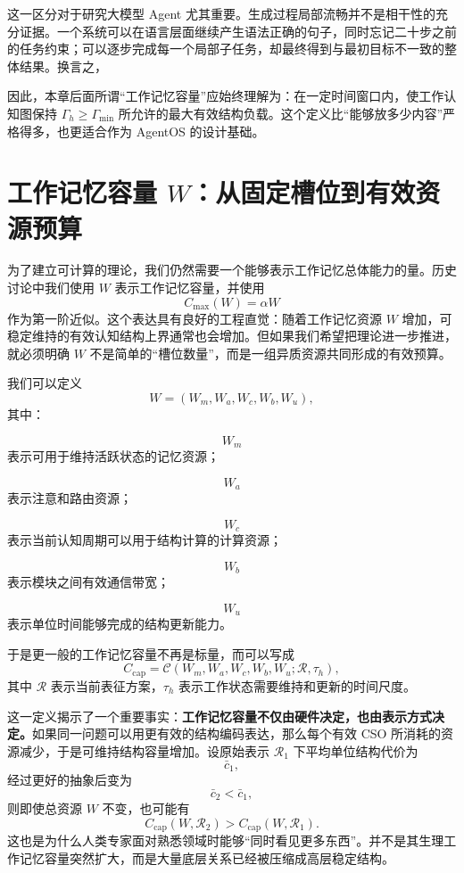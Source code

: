这一区分对于研究大模型 Agent 尤其重要。生成过程局部流畅并不是相干性的充分证据。一个系统可以在语言层面继续产生语法正确的句子，同时忘记二十步之前的任务约束；可以逐步完成每一个局部子任务，却最终得到与最初目标不一致的整体结果。换言之，
\begin{statementbox}
\centering
{}
\end{statementbox}

因此，本章后面所谓“工作记忆容量”应始终理解为：在一定时间窗口内，使工作认知图保持 $\Gamma_h\geq\Gamma_{\min}$ 所允许的最大有效结构负载。这个定义比“能够放多少内容”严格得多，也更适合作为 AgentOS 的设计基础。


\section{工作记忆容量 $W$：从固定槽位到有效资源预算}
\label{sec:working-memory-W}

为了建立可计算的理论，我们仍然需要一个能够表示工作记忆总体能力的量。历史讨论中我们使用 $W$ 表示工作记忆容量，并使用
\[
C_{\max}(W)=\alpha W
\]
作为第一阶近似。这个表达具有良好的工程直觉：随着工作记忆资源 $W$ 增加，可稳定维持的有效认知结构上界通常也会增加。但如果我们希望把理论进一步推进，就必须明确 $W$ 不是简单的“槽位数量”，而是一组异质资源共同形成的有效预算。

我们可以定义
\[
W
=
\left(
W_m,
W_a,
W_c,
W_b,
W_u
\right),
\]
其中：

\[
W_m
\]
表示可用于维持活跃状态的记忆资源；

\[
W_a
\]
表示注意和路由资源；

\[
W_c
\]
表示当前认知周期可以用于结构计算的计算资源；

\[
W_b
\]
表示模块之间有效通信带宽；

\[
W_u
\]
表示单位时间能够完成的结构更新能力。

于是更一般的工作记忆容量不再是标量，而可以写成
\[
C_{\mathrm{cap}}
=
\mathcal{C}
\left(
W_m,W_a,W_c,W_b,W_u;
\mathcal{R},\tau_h
\right),
\]
其中 $\mathcal{R}$ 表示当前表征方案，$\tau_h$ 表示工作状态需要维持和更新的时间尺度。

这一定义揭示了一个重要事实：\textbf{工作记忆容量不仅由硬件决定，也由表示方式决定。}如果同一问题可以用更有效的结构编码表达，那么每个有效 CSO 所消耗的资源减少，于是可维持结构容量增加。设原始表示 $\mathcal{R}_1$ 下平均单位结构代价为
\[
\bar c_1,
\]
经过更好的抽象后变为
\[
\bar c_2<\bar c_1,
\]
则即使总资源 $W$ 不变，也可能有
\[
C_{\mathrm{cap}}(W,\mathcal R_2)
>
C_{\mathrm{cap}}(W,\mathcal R_1).
\]
这也是为什么人类专家面对熟悉领域时能够“同时看见更多东西”。并不是其生理工作记忆容量突然扩大，而是大量底层关系已经被压缩成高层稳定结构。

